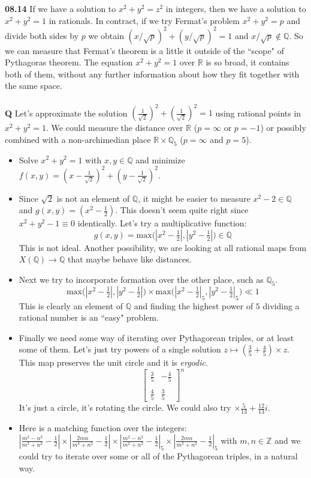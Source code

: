 \documentclass[12pt]{article}
\begin{document}
\noindent \textbf{08.14} If we have a solution to $x^2 + y^2 = z^2$ in integers, then we have a solution to $x^2 + y^2 = 1$ in rationals.  In contract, if we try Fermat's problem $x^2 + y^2 = p$ and divide both sides by $p$ we obtain $(x/\sqrt{p})^2 + (y/\sqrt{p})^2 = 1$ and $x/\sqrt{p} \notin \mathbb{Q}$.  So we can measure that Fermat's theorem is a little it outside of the ``scope" of Pythagoras theorem.  The equation $x^2 + y^2 = 1$ over $\mathbb{R}$ is so broad, it contains both of them, without any further information about how they fit together with the same space. \\ \\
\textbf{Q} Let's approximate the solution $(\frac{1}{\sqrt{2}})^2 + (\frac{1}{\sqrt{2}})^2 = 1$ using rational points in $x^2 + y^2 = 1$.  We could measure the distance over $\mathbb{R}$ ($p = \infty$ or $p = -1$) or possibly combined with a non-archimedian place $\mathbb{R} \times \mathbb{Q}_5$  ($p = \infty$ and $p = 5$). 
\begin{itemize}
\item Solve $x^2 + y^2 = 1$ with $x,y \in \mathbb{Q}$ and minimize $f(x,y) =  (x - \frac{1}{\sqrt{2}})^2 + (y - \frac{1}{\sqrt{2}})^2  $. 
\item Since $\sqrt{2}$ is not an element of $\mathbb{Q}$, it might be easier to measure $x^2 - 2 \in \mathbb{Q}$ and $g(x,y) = (x^2 - \frac{1}{2})$. This doesn't seem quite right since $x^2 + y^2 - 1 \equiv 0$ identically. Let's try a multiplicative function:
$$ g(x,y) = \text{max} \big( |x^2 - \tfrac{1}{2}| , |y^2 - \tfrac{1}{2}| \big) \in \mathbb{Q} $$
This is not ideal.  Another possibility, we are looking at all rational maps from $X(\mathbb{Q}) \to \mathbb{Q}$ that maybe behave like distances. 
\item Next we try to incorporate formation over the other place, such as $\mathbb{Q}_5$.
$$ \text{max} \big( |x^2 - \tfrac{1}{2}| , |y^2 - \tfrac{1}{2}| \big) \times \text{max} \big( |x^2 - \tfrac{1}{2}|_5 , |y^2 - \tfrac{1}{2}|_5 \big)  \ll 1 $$
This is clearly an element of $\mathbb{Q}$ and finding the highest power of $5$ dividing a rational number is an ``easy" problem.
\item Finally we need some way of iterating over Pythagorean triples, or at least some of them.  Let's just try powers of a single solution $z \mapsto (\frac{3}{5} + \frac{4}{5} ) \times z$.  This map preserves the unit circle and it is \textit{ergodic}.
$$ \left[ \begin{array}{cr} \frac{3}{5} & -\frac{4}{5} \\ \\
\frac{4}{5} & \frac{3}{5}\end{array} \right]^n $$   
It's just a circle, it's rotating the circle.  We could also try $ \times \frac{5}{13} +  \frac{12}{13}i$.
\item Here is a matching function over the integers: $ |\frac{m^2 - n^2}{m^2 + n^2} - \frac{1}{2}| \times |\frac{2mn}{m^2 + n^2} - \frac{1}{2}| \times 
|\frac{m^2 - n^2}{m^2 + n^2} - \frac{1}{2}|_5 \times |\frac{2mn}{m^2 + n^2} - \frac{1}{2}|_5$ with $m, n \in \mathbb{Z}$ and we could try to iterate over some or all of the Pythagorean triples, in a natural way.
\end{itemize}
\end{document}
